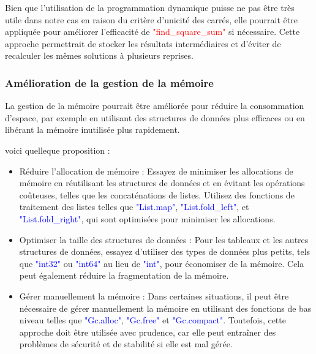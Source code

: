 \documentclass{article}
\begin{document}
 Bien que l'utilisation de la programmation dynamique puisse ne pas être très utile dans notre cas en raison du critère d'unicité des carrés, elle pourrait être appliquée pour améliorer l'efficacité de \textcolor{red}{"find\_square\_sum"} si nécessaire. Cette approche permettrait de stocker les résultats intermédiaires et d'éviter de recalculer les mêmes solutions à plusieurs reprises.\newline
 
\subsubsection{Amélioration de la gestion de la mémoire}

La gestion de la mémoire pourrait être améliorée pour réduire la consommation d'espace, par exemple en utilisant des structures de données plus efficaces ou en libérant la mémoire inutilisée plus rapidement.\newline

voici quelleque proposition :

\begin{itemize}
  \item Réduire l'allocation de mémoire : Essayez de minimiser les allocations de mémoire en réutilisant les structures de données et en évitant les opérations coûteuses, telles que les concaténations de listes. Utilisez des fonctions de traitement des listes telles que \textcolor{blue}{"List.map"}, \textcolor{blue}{"List.fold\_left"}, et \textcolor{blue}{"List.fold\_right"}, qui sont optimisées pour minimiser les allocations.\newline
  \item Optimiser la taille des structures de données : Pour les tableaux et les autres structures de données, essayez d'utiliser des types de données plus petits, tels que \textcolor{blue}{"int32"} ou \textcolor{blue}{"int64"} au lieu de \textcolor{blue}{"int"}, pour économiser de la mémoire. Cela peut également réduire la fragmentation de la mémoire.\newline
  \item Gérer manuellement la mémoire : Dans certaines situations, il peut être nécessaire de gérer manuellement la mémoire en utilisant des fonctions de bas niveau telles que \textcolor{blue}{"Gc.alloc"}, \textcolor{blue}{"Gc.free"} et \textcolor{blue}{"Gc.compact"}. Toutefois, cette approche doit être utilisée avec prudence, car elle peut entraîner des problèmes de sécurité et de stabilité si elle est mal gérée.\newline
\end{itemize}
\end{document}
